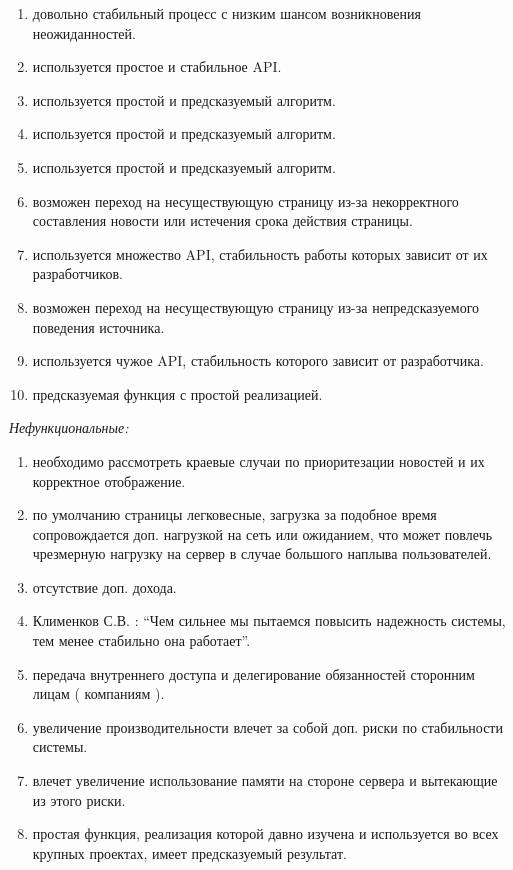 \begin{enumerate}[noitemsep,topsep=0pt,parsep=0pt,partopsep=0pt]
    \item довольно стабильный процесс с низким шансом возникновения неожиданностей.
    \item используется простое и стабильное API.
    \item используется простой и предсказуемый алгоритм.
    \item используется простой и предсказуемый алгоритм.
    \item используется простой и предсказуемый алгоритм.
    \item возможен переход на несуществующую страницу из-за некорректного составления новости или истечения срока действия страницы.
    \item используется множество API, стабильность работы которых зависит от их разработчиков.
    \item возможен переход на несуществующую страницу из-за непредсказуемого поведения источника.
    \item используется чужое API, стабильность которого зависит от разработчика.
    \item предсказуемая функция с простой реализацией.
\end{enumerate}
\newpage
\BgThispage
\textit{Нефункциональные:}
\begin{enumerate}[noitemsep,topsep=0pt,parsep=0pt,partopsep=0pt]
    \item необходимо рассмотреть краевые случаи по приоритезации новостей и их корректное отображение.
    \item по умолчанию страницы легковесные, загрузка за подобное время сопровождается доп. нагрузкой на сеть или ожиданием, что может повлечь чрезмерную нагрузку на сервер в случае большого наплыва пользователей.
    \item отсутствие доп. дохода.
    \item Клименков С.В. : “Чем сильнее мы пытаемся повысить надежность системы, тем менее стабильно она работает”.
    \item передача внутреннего доступа и делегирование обязанностей сторонним лицам ( компаниям ).
    \item увеличение производительности влечет за собой доп. риски по стабильности системы.
    \item влечет увеличение использование памяти на стороне сервера и вытекающие из этого риски.
    \item простая функция, реализация которой давно изучена и используется во всех крупных проектах, имеет предсказуемый результат.
\end{enumerate}
